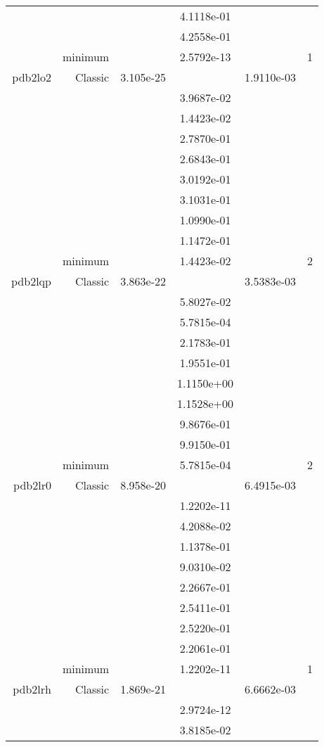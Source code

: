 \begin{xltabular}{\textwidth}{r|rS[table-format=1.3e+2]S[table-format=1.4e+2]S[table-format=1.4e+2]S[table-format=-1.5]}
&  &  & 4.1118e-01 & & \\
&  &  & 4.2558e-01 & & \\
& minimum &  & 2.5792e-13 & & 1 \\  \addlinespace
pdb2lo2 & Classic & 3.105e-25 &  & 1.9110e-03 & \\
&  &  & 3.9687e-02 & & \\
&  &  & 1.4423e-02 & & \\
&  &  & 2.7870e-01 & & \\
&  &  & 2.6843e-01 & & \\
&  &  & 3.0192e-01 & & \\
&  &  & 3.1031e-01 & & \\
&  &  & 1.0990e-01 & & \\
&  &  & 1.1472e-01 & & \\
& minimum &  & 1.4423e-02 & & 2 \\  \addlinespace
pdb2lqp & Classic & 3.863e-22 &  & 3.5383e-03 & \\
&  &  & 5.8027e-02 & & \\
&  &  & 5.7815e-04 & & \\
&  &  & 2.1783e-01 & & \\
&  &  & 1.9551e-01 & & \\
&  &  & 1.1150e+00 & & \\
&  &  & 1.1528e+00 & & \\
&  &  & 9.8676e-01 & & \\
&  &  & 9.9150e-01 & & \\
& minimum &  & 5.7815e-04 & & 2 \\  \addlinespace
pdb2lr0 & Classic & 8.958e-20 &  & 6.4915e-03 & \\
&  &  & 1.2202e-11 & & \\
&  &  & 4.2088e-02 & & \\
&  &  & 1.1378e-01 & & \\
&  &  & 9.0310e-02 & & \\
&  &  & 2.2667e-01 & & \\
&  &  & 2.5411e-01 & & \\
&  &  & 2.5220e-01 & & \\
&  &  & 2.2061e-01 & & \\
& minimum &  & 1.2202e-11 & & 1 \\  \addlinespace
pdb2lrh & Classic & 1.869e-21 &  & 6.6662e-03 & \\
&  &  & 2.9724e-12 & & \\
&  &  & 3.8185e-02 & & \\

\end{xltabular}
